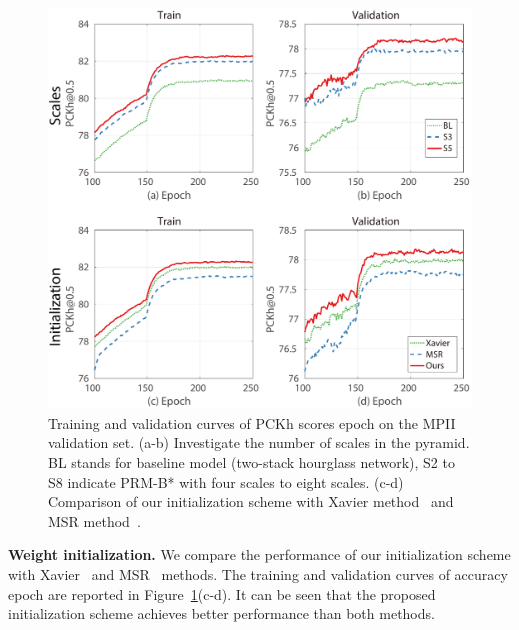 \documentclass[10pt,twocolumn,letterpaper]{article}
\newcommand{\smalltitle}[1]{\vspace{0.2em}\noindent \textbf{{#1}}}
\begin{document}
\begin{figure}
	\begin{center}
		\includegraphics[width=1\linewidth]{figures/scales_vs_init3.pdf}
	\end{center}
	\vspace{-1em}
	\caption{ Training and validation curves of PCKh scores \vs epoch on the MPII validation set. (a-b) Investigate the number of scales in the pyramid. BL stands for baseline model (two-stack hourglass network), S2 to S8 indicate PRM-B* with four scales to eight scales. 
	(c-d) Comparison of our initialization scheme with Xavier method~\cite{glorot2010understanding} and MSR method~\cite{he2015delving}. }
	\label{fig:scales_and_initialization}
	\vspace{-1.2em}
\end{figure}

\smalltitle{Weight initialization.} 
We compare the performance of our initialization scheme with Xavier~\cite{glorot2010understanding} and MSR~\cite{he2015delving} methods. 
The training and validation curves of accuracy \vs epoch are reported in Figure~\ref{fig:scales_and_initialization}(c-d). 
It can be seen that the proposed initialization scheme achieves better performance than both methods. 

\end{document}
